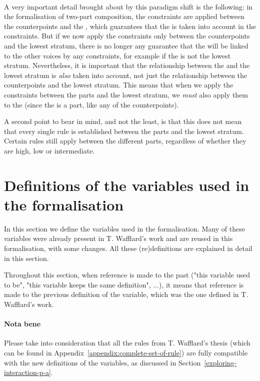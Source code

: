 \paragraph{}
A very important detail brought about by this paradigm shift is the following: in the formalisation of two-part composition, the constraints are applied between the counterpoints and the \cf, which guarantees that the \cfs is taken into account in the constraints. But if we now apply the constraints only between the counterpoints and the lowest stratum, there is no longer any guarantee that the \cfs will be linked to the other voices by any constraints, for example if the \cfs is not the lowest stratum. Nevertheless, it is important that the relationship between the \cfs and the lowest stratum is \textit{also} taken into account, not just the relationship between the counterpoints and the lowest stratum. This means that when we apply the constraints between the parts and the lowest stratum, we \textit{must} also apply them to the \cfs (since the \cfs is a part, like any of the counterpoints).

A second point to bear in mind, and not the least, is that this does not mean that every single rule is established between the parts and the lowest stratum. Certain rules still apply between the different parts, regardless of whether they are high, low or intermediate.

\section{Definitions of the variables used in the formalisation} \label{section:changes induced}
In this section we define the variables used in the formalisation. Many of these variables were already present in T. Wafflard's work and are reused in this formalisation, with some changes. All these (re)definitions are explained in detail in this section.

Throughout this section, when reference is made to the past ("this variable used to be", "this variable keeps the same definition", ...), it means that reference is made to the previous definition of the variable, which was the one defined in T. Wafflard's work.

\paragraph{Nota bene}
Please take into consideration that all the rules from T. Wafflard's thesis (which can be found in Appendix~\ref{appendix:complete-set-of-rule}) are fully compatible with the new definitions of the variables, as discussed in Section~\ref{exploring-interaction-p-a}. 

